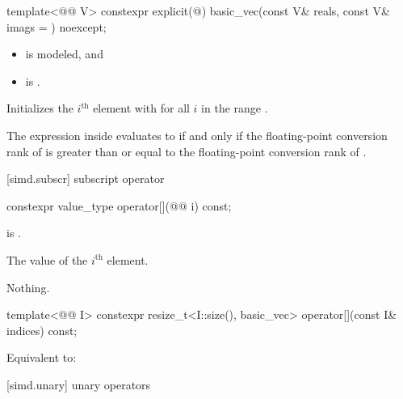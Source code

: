 \begin{itemdecl}
template<@@ V>
  constexpr explicit(@\seebelow@)
    basic_vec(const V& reals, const V& imags = {}) noexcept;
\end{itemdecl}

\begin{itemdescr}
\pnum
\constraints
\begin{itemize}
 \item
    is modeled, and
 \item
    is .
\end{itemize}

\pnum
\effects
Initializes the $i^\text{th}$ element with  for all $i$ in the range .

\pnum
\remarks
The expression inside  evaluates to  if and only
if the floating-point conversion rank of  is greater than
or equal to the floating-point conversion rank of .
\end{itemdescr}

[simd.subscr]{ subscript operator}

\begin{itemdecl}
constexpr value_type operator[](@@ i) const;
\end{itemdecl}

\begin{itemdescr}
\pnum
\expects
{} is .

\pnum
\returns
The value of the $i^\text{th}$ element.

\pnum
\throws
Nothing.
\end{itemdescr}

\begin{itemdecl}
template<@@ I>
  constexpr resize_t<I::size(), basic_vec> operator[](const I& indices) const;
\end{itemdecl}

\begin{itemdescr}
\pnum
\effects
Equivalent to: 
\end{itemdescr}

[simd.unary]{ unary operators}

